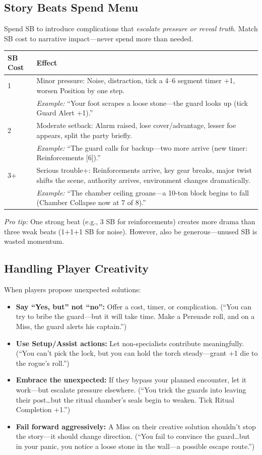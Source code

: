 \subsection{Story Beats Spend Menu}
\label{sec:sb-menu}
Spend SB to introduce complications that \textit{escalate pressure or reveal truth}. Match SB cost to narrative impact---never spend more than needed.

\begin{center}
\begin{tabular}{p{1.5cm}p{10cm}}
\toprule
\textbf{SB Cost} & \textbf{Effect} \\
\midrule
1 & Minor pressure: Noise, distraction, tick a 4--6 segment timer +1, worsen Position by one step. \\
& \textit{Example:} ``Your foot scrapes a loose stone---the guard looks up (tick Guard Alert +1).'' \\
2 & Moderate setback: Alarm raised, lose cover/advantage, lesser foe appears, split the party briefly. \\
& \textit{Example:} ``The guard calls for backup---two more arrive (new timer: Reinforcements [6]).'' \\
3+ & Serious trouble+: Reinforcements arrive, key gear breaks, major twist shifts the scene, authority arrives, environment changes dramatically. \\
& \textit{Example:} ``The chamber ceiling groans---a 10-ton block begins to fall (Chamber Collapse now at 7 of 8).'' \\
\bottomrule
\end{tabular}
\end{center}
\textit{Pro tip:} One strong beat (e.g., 3 SB for reinforcements) creates more drama than three weak beats (1+1+1 SB for noise). However, also be generous---unused SB is wasted momentum.

\subsection{Handling Player Creativity}
When players propose unexpected solutions:
\begin{itemize}
  \item \textbf{Say ``Yes, but'' not ``no'':} Offer a cost, timer, or complication. (``You can try to bribe the guard---but it will take time. Make a Persuade roll, and on a Miss, the guard alerts his captain.'')
  \item \textbf{Use Setup/Assist actions:} Let non-specialists contribute meaningfully. (``You can't pick the lock, but you can hold the torch steady---grant +1 die to the rogue's roll.'')
  \item \textbf{Embrace the unexpected:} If they bypass your planned encounter, let it work---but escalate pressure elsewhere. (``You trick the guards into leaving their post\dots but the ritual chamber's seals begin to weaken. Tick Ritual Completion +1.'')
  \item \textbf{Fail forward aggressively:} A Miss on their creative solution shouldn't stop the story---it should change direction. (``You fail to convince the guard\dots but in your panic, you notice a loose stone in the wall---a possible escape route.'')
\end{itemize}


